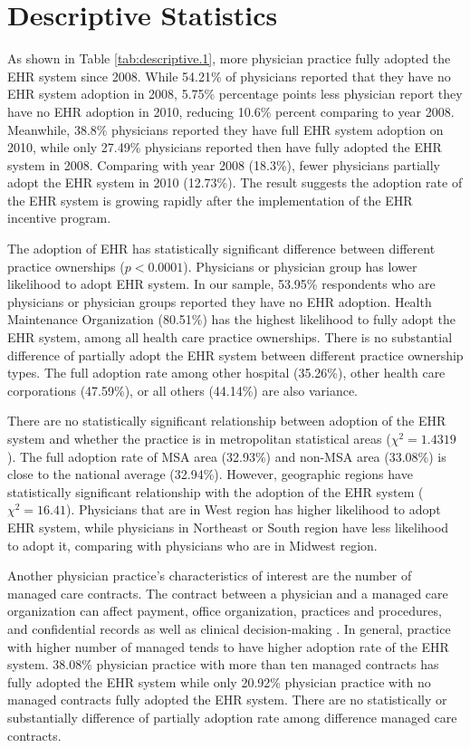 \chapter{Descriptive Statistics}

As shown in Table \ref{tab:descriptive.1}, more physician practice fully adopted the EHR system since 2008. While 54.21\% of physicians reported that they have no EHR system adoption in 2008, 5.75\% percentage points less physician report they have no EHR adoption in 2010, reducing 10.6\% percent comparing to year 2008. Meanwhile, 38.8\% physicians reported they have full EHR system adoption on 2010, while only 27.49\% physicians reported then have fully adopted the EHR system in 2008. Comparing with year 2008 (18.3\%), fewer physicians partially adopt the EHR system in 2010 (12.73\%). The result suggests the adoption rate of the EHR system is growing rapidly after the implementation of the EHR incentive program.

The adoption of EHR has statistically significant difference between different practice ownerships ($p<0.0001$). Physicians or physician group has lower likelihood to adopt EHR system. In our sample, 53.95\% respondents who are physicians or physician groups reported they have no EHR adoption. Health Maintenance Organization (80.51\%) has the highest likelihood to fully adopt the EHR system, among all health care practice ownerships. There is no substantial difference of partially adopt the EHR system between different practice ownership types. The full adoption rate among other hospital (35.26\%), other health care corporations (47.59\%), or all others (44.14\%) are also variance. 

There are no statistically significant relationship between adoption of the EHR system and whether the practice is in metropolitan statistical areas ($\chi^2=1.4319$). The full adoption rate of MSA area (32.93\%) and non-MSA area (33.08\%) is close to the national average (32.94\%). However, geographic regions have statistically significant relationship with the adoption of the EHR system ($\chi^2=16.41$). Physicians that are in West region has higher likelihood to adopt EHR system, while physicians in Northeast or South region have less likelihood to adopt it, comparing with physicians who are in Midwest region.

Another physician practice's characteristics of interest are the number of managed care contracts. The contract between a physician and a managed care organization can affect payment, office organization, practices and procedures, and confidential records as well as clinical decision-making \citep{mcc2008}. In general, practice with higher number of managed tends to have higher adoption rate of the EHR system. 38.08\% physician practice with more than ten managed contracts has fully adopted the EHR system while only 20.92\% physician practice with no managed contracts fully adopted the EHR system. There are no statistically or substantially difference of partially adoption rate among difference managed care contracts.

